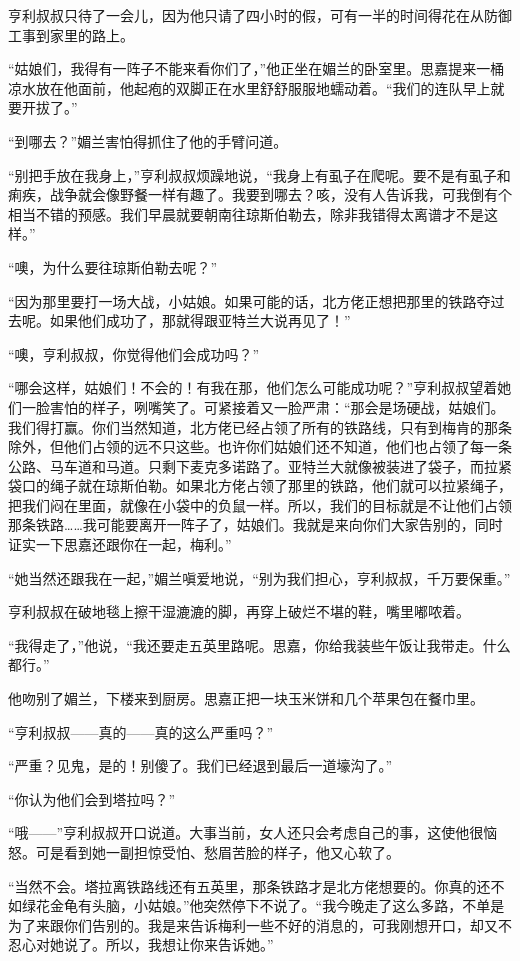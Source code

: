 \par 亨利叔叔只待了一会儿，因为他只请了四小时的假，可有一半的时间得花在从防御工事到家里的路上。
\par “姑娘们，我得有一阵子不能来看你们了，”他正坐在媚兰的卧室里。思嘉提来一桶凉水放在他面前，他起疱的双脚正在水里舒舒服服地蠕动着。“我们的连队早上就要开拔了。”
\par “到哪去？”媚兰害怕得抓住了他的手臂问道。
\par “别把手放在我身上，”亨利叔叔烦躁地说，“我身上有虱子在爬呢。要不是有虱子和痢疾，战争就会像野餐一样有趣了。我要到哪去？咳，没有人告诉我，可我倒有个相当不错的预感。我们早晨就要朝南往琼斯伯勒去，除非我错得太离谱才不是这样。”
\par “噢，为什么要往琼斯伯勒去呢？”
\par “因为那里要打一场大战，小姑娘。如果可能的话，北方佬正想把那里的铁路夺过去呢。如果他们成功了，那就得跟亚特兰大说再见了！”
\par “噢，亨利叔叔，你觉得他们会成功吗？”
\par “哪会这样，姑娘们！不会的！有我在那，他们怎么可能成功呢？”亨利叔叔望着她们一脸害怕的样子，咧嘴笑了。可紧接着又一脸严肃：“那会是场硬战，姑娘们。我们得打赢。你们当然知道，北方佬已经占领了所有的铁路线，只有到梅肯的那条除外，但他们占领的远不只这些。也许你们姑娘们还不知道，他们也占领了每一条公路、马车道和马道。只剩下麦克多诺路了。亚特兰大就像被装进了袋子，而拉紧袋口的绳子就在琼斯伯勒。如果北方佬占领了那里的铁路，他们就可以拉紧绳子，把我们闷在里面，就像在小袋中的负鼠一样。所以，我们的目标就是不让他们占领那条铁路……我可能要离开一阵子了，姑娘们。我就是来向你们大家告别的，同时证实一下思嘉还跟你在一起，梅利。”
\par “她当然还跟我在一起，”媚兰嗔爱地说，“别为我们担心，亨利叔叔，千万要保重。”
\par 亨利叔叔在破地毯上擦干湿漉漉的脚，再穿上破烂不堪的鞋，嘴里嘟哝着。
\par “我得走了，”他说，“我还要走五英里路呢。思嘉，你给我装些午饭让我带走。什么都行。”
\par 他吻别了媚兰，下楼来到厨房。思嘉正把一块玉米饼和几个苹果包在餐巾里。
\par “亨利叔叔——真的——真的这么严重吗？”
\par “严重？见鬼，是的！别傻了。我们已经退到最后一道壕沟了。”
\par “你认为他们会到塔拉吗？”
\par “哦——”亨利叔叔开口说道。大事当前，女人还只会考虑自己的事，这使他很恼怒。可是看到她一副担惊受怕、愁眉苦脸的样子，他又心软了。
\par “当然不会。塔拉离铁路线还有五英里，那条铁路才是北方佬想要的。你真的还不如绿花金龟有头脑，小姑娘。”他突然停下不说了。“我今晚走了这么多路，不单是为了来跟你们告别的。我是来告诉梅利一些不好的消息的，可我刚想开口，却又不忍心对她说了。所以，我想让你来告诉她。”
